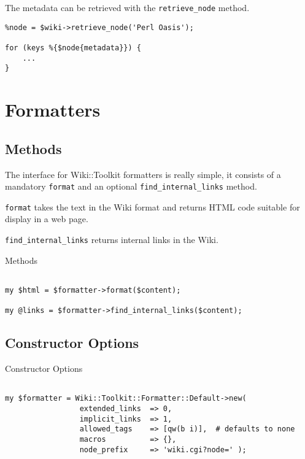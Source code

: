 The metadata can be retrieved with the \verb+retrieve_node+ method.

\begin{lstlisting}
%node = $wiki->retrieve_node('Perl Oasis');

for (keys %{$node{metadata}}) {
    ...
}
\end{lstlisting}




\section{Formatters}

\subsection{Methods}

The interface for Wiki::Toolkit formatters is really simple, it consists
of a mandatory \verb+format+ and an optional \verb+find_internal_links+
method.

\verb+format+ takes the text in the Wiki format and returns HTML code
suitable for display in a web page.

\verb+find_internal_links+ returns internal links in the Wiki.

\begin{frame}[fragile]{Methods}
\begin{lstlisting}

my $html = $formatter->format($content);

my @links = $formatter->find_internal_links($content);

\end{lstlisting}
\end{frame}

\subsection{Constructor Options}


\begin{frame}[fragile]{Constructor Options}
\begin{lstlisting}

my $formatter = Wiki::Toolkit::Formatter::Default->new(
                 extended_links  => 0,
                 implicit_links  => 1,
                 allowed_tags    => [qw(b i)],  # defaults to none
                 macros          => {},
                 node_prefix     => 'wiki.cgi?node=' );

\end{lstlisting}
\end{frame}

